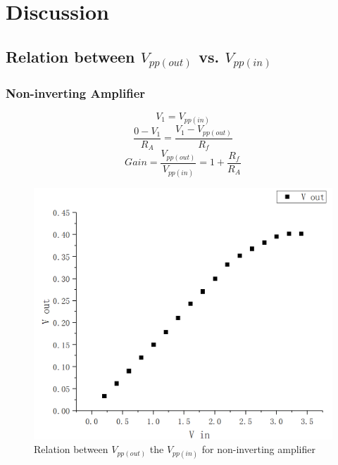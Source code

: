 \documentclass[12pt]{article}
\begin{document}
\section{Discussion}
\subsection{Relation between $V_{pp(out)}$ vs. $V_{pp(in)}$}
\subsubsection{Non-inverting Amplifier}
$$V_1=V_{pp(in)}$$
$$\frac{0-V_1}{R_A}=\frac{V_1-V_{pp(out)}}{R_f}$$
$$Gain=\frac{V_{pp(out)}}{V_{pp(in)}}=1+\frac{R_f}{R_A}$$
\begin{figure}[H]
\centering
\includegraphics[scale=0.3]{P7.jpg}
\caption{Relation between $V_{pp(out)}$ the $V_{pp(in)}$ for non-inverting amplifier}
\end{figure}
\end{document}
